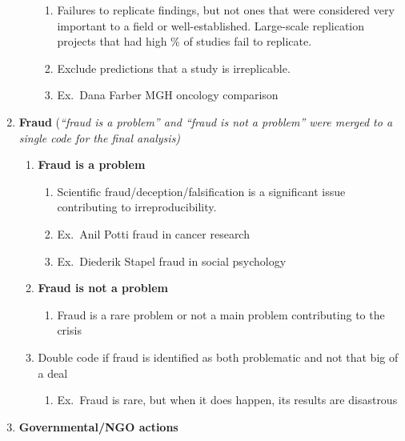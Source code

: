 \documentclass[
]{scrartcl}
\providecommand{\tightlist}{%
  \setlength{\itemsep}{0pt}\setlength{\parskip}{0pt}}
\begin{document}
\begin{enumerate}
\begin{enumerate}
    \begin{enumerate}
    
    \item
      Failures to replicate findings, but not ones that were considered
      very important to a field or well-established. Large-scale
      replication projects that had high \% of studies fail to
      replicate.
    \item
      Exclude predictions that a study is irreplicable.
    \item
      Ex.~Dana Farber MGH oncology comparison
    \end{enumerate}
  \end{enumerate}
\item
  \textbf{Fraud} (\emph{``fraud is a problem'' and ``fraud is not a
  problem'' were merged to a single code for the final analysis)}

  \begin{enumerate}

  \item
    \textbf{Fraud is a problem}

    \begin{enumerate}
    
    \item
      Scientific fraud/deception/falsification is a significant issue
      contributing to irreproducibility.
    \item
      Ex.~Anil Potti fraud in cancer research
    \item
      Ex.~Diederik Stapel fraud in social psychology
    \end{enumerate}
  \item
    \textbf{Fraud is not a problem}

    \begin{enumerate}
    
    \tightlist
    \item
      Fraud is a rare problem or not a main problem contributing to the
      crisis
    \end{enumerate}
  \item
    Double code if fraud is identified as both problematic and not that
    big of a deal

    \begin{enumerate}
    
    \tightlist
    \item
      Ex.~Fraud is rare, but when it does happen, its results are
      disastrous
    \end{enumerate}
  \end{enumerate}
\item
  \textbf{Governmental/NGO actions}


\end{enumerate}
\end{document}
